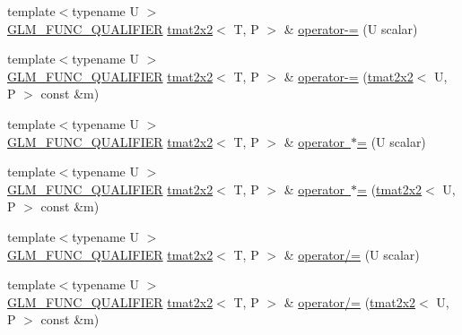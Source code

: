 \begin{DoxyCompactItemize}
\item 
{\footnotesize template$<$typename U $>$ }\\\mbox{\hyperlink{setup_8hpp_a33fdea6f91c5f834105f7415e2a64407}{G\+L\+M\+\_\+\+F\+U\+N\+C\+\_\+\+Q\+U\+A\+L\+I\+F\+I\+ER}} \mbox{\hyperlink{structglm_1_1tmat2x2}{tmat2x2}}$<$ T, P $>$ \& \mbox{\hyperlink{structglm_1_1tmat2x2_a07fbdd2d18d893c7d6c1b662786983ea}{operator-\/=}} (U scalar)
\item 
{\footnotesize template$<$typename U $>$ }\\\mbox{\hyperlink{setup_8hpp_a33fdea6f91c5f834105f7415e2a64407}{G\+L\+M\+\_\+\+F\+U\+N\+C\+\_\+\+Q\+U\+A\+L\+I\+F\+I\+ER}} \mbox{\hyperlink{structglm_1_1tmat2x2}{tmat2x2}}$<$ T, P $>$ \& \mbox{\hyperlink{structglm_1_1tmat2x2_aa547a3bd8160981d285b9fef6cb5eff1}{operator-\/=}} (\mbox{\hyperlink{structglm_1_1tmat2x2}{tmat2x2}}$<$ U, P $>$ const \&m)
\item 
{\footnotesize template$<$typename U $>$ }\\\mbox{\hyperlink{setup_8hpp_a33fdea6f91c5f834105f7415e2a64407}{G\+L\+M\+\_\+\+F\+U\+N\+C\+\_\+\+Q\+U\+A\+L\+I\+F\+I\+ER}} \mbox{\hyperlink{structglm_1_1tmat2x2}{tmat2x2}}$<$ T, P $>$ \& \mbox{\hyperlink{structglm_1_1tmat2x2_a26daa17e6e7e78eee21d9bb35e19edb8}{operator $\ast$=}} (U scalar)
\item 
{\footnotesize template$<$typename U $>$ }\\\mbox{\hyperlink{setup_8hpp_a33fdea6f91c5f834105f7415e2a64407}{G\+L\+M\+\_\+\+F\+U\+N\+C\+\_\+\+Q\+U\+A\+L\+I\+F\+I\+ER}} \mbox{\hyperlink{structglm_1_1tmat2x2}{tmat2x2}}$<$ T, P $>$ \& \mbox{\hyperlink{structglm_1_1tmat2x2_aec795a5240b0d23aff31f1806970d95a}{operator $\ast$=}} (\mbox{\hyperlink{structglm_1_1tmat2x2}{tmat2x2}}$<$ U, P $>$ const \&m)
\item 
{\footnotesize template$<$typename U $>$ }\\\mbox{\hyperlink{setup_8hpp_a33fdea6f91c5f834105f7415e2a64407}{G\+L\+M\+\_\+\+F\+U\+N\+C\+\_\+\+Q\+U\+A\+L\+I\+F\+I\+ER}} \mbox{\hyperlink{structglm_1_1tmat2x2}{tmat2x2}}$<$ T, P $>$ \& \mbox{\hyperlink{structglm_1_1tmat2x2_ad53aeb4165a4776038788c1c03a87c6e}{operator/=}} (U scalar)
\item 
{\footnotesize template$<$typename U $>$ }\\\mbox{\hyperlink{setup_8hpp_a33fdea6f91c5f834105f7415e2a64407}{G\+L\+M\+\_\+\+F\+U\+N\+C\+\_\+\+Q\+U\+A\+L\+I\+F\+I\+ER}} \mbox{\hyperlink{structglm_1_1tmat2x2}{tmat2x2}}$<$ T, P $>$ \& \mbox{\hyperlink{structglm_1_1tmat2x2_a3d12dbc4378d84707572ab61ae1b1b30}{operator/=}} (\mbox{\hyperlink{structglm_1_1tmat2x2}{tmat2x2}}$<$ U, P $>$ const \&m)
\end{DoxyCompactItemize}
